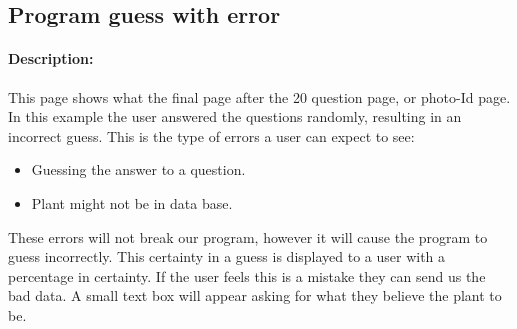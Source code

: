 \documentclass[a4paper]{article}
\begin{document}
\subsection{Program guess with error}
\paragraph{Description:}
This page shows what the final page after the 20 question page, or photo-Id page. In this example the user answered the questions randomly, resulting in an incorrect guess. This is the type of errors a user can expect to see:
\begin{itemize}
\item Guessing the answer to a question.
\item Plant might not be in data base.
\end{itemize}
These errors will not break our program, however it will cause the program to guess incorrectly. This certainty in a guess is displayed to a user with a percentage in certainty. If the user feels this is a mistake they can send us the bad data. A small text box will appear asking for what they believe the plant to be.
\end{document}
